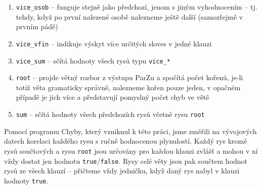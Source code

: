 \documentclass[12pt,a4paper]{report}
\begin{document}
\begin{enumerate}
\item{\texttt{vice\_osob} -- funguje stejně jako předchozí, jenom s jiným vyhodnocením -- tj. tehdy, když po první nalezené osobě nalezneme ještě další (samozřejmě v prvním pádě)}
\item{\texttt{vice\_vfin} -- indikuje výskyt více určitých sloves v jedné klauzi}
\item{\texttt{vice\_sum} -- sčítá hodnoty všech rysů typu \texttt{vice\_*}}
\item{\texttt{root} -- projde větný rozbor z výstupu ParZu a spočítá počet kořenů, je-li totiž věta gramaticky správně, nalezneme kořen pouze jeden, v opačném případě je jich více a představují pomyslný počet chyb ve větě}
\item{\texttt{sum} -- sčítá hodnoty všech předchozích rysů včetně rysu \texttt{root}}
\end{enumerate}

Pomocí programu Chyby, který vzniknul k této práci, jsme změřili na vývojových datech korelaci každého rysu s ručně hodnocenou plynulostí. Každý rys kromě rysů součtových a rysu \texttt{root} jsou určovány pro každou klauzi zvlášť a mohou v ní vždy dostat jen hodnotu \texttt{true}/\texttt{false}. Rysy celé věty jsou pak součtem hodnot rysů ze všech klauzí -- přičteme vždy jedničku, když daný rys nabyl v klauzi hodnoty \texttt{true}.
\end{document}
